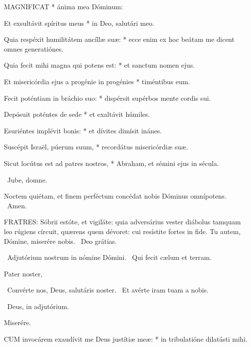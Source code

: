 \lettrine[lines=2]{M}{AGNIFICAT} * ánima mea Dóminum:

Et exsultávit spíritus meus * in Deo, salutári meo.

Quia respéxit humilitátem ancíllæ suæ: * ecce enim ex hoc beátam me dicent omnes generatiónes.

Quia fecit mihi magna qui potens est: * et sanctum nomen ejus.

Et misericórdia ejus a progénie in progénies * timéntibus eum.

Fecit poténtiam in bráchio suo: * dispérsit supérbos mente cordis sui.

Depósuit poténtes de sede * et exaltávit húmiles.

Esuriéntes implévit bonis: * et dívites dimísit inánes.

Suscépit Israël, púerum suum, * recordátus misericórdiæ suæ.

Sicut locútus est ad patres nostros, * Abraham, et sémini ejus in sécula.



\sectionornament


\V\ Jube, domne.

 Noctem quiétam, et finem perféctum concédat nobis Dóminus omnípotens. \R\ Amen.


\lettrine[lines=2]{F}{RATRES}: Sóbrii estóte, et vigiláte: quia adversárius vester diábolus tamquam leo rúgiens círcuit, quærens quem dévoret: cui resístite fortes in fide. Tu autem, Dómine, miserére nobis. \R\ Deo grátias.

\V\ Adjutórium nostrum in nómine Dómini. \R\ Qui fecit cælum et terram.

Pater noster, 


\V\ Convérte nos, Deus, salutáris noster. \R\ Et avérte iram tuam a nobis.

\V\ Deus, in adjutórium.

 Miserére.


\lettrine[lines=2]{C}{UM} invocárem exaudívit me Deus justítiæ meæ: * in tribulatióne dilatásti mihi.

